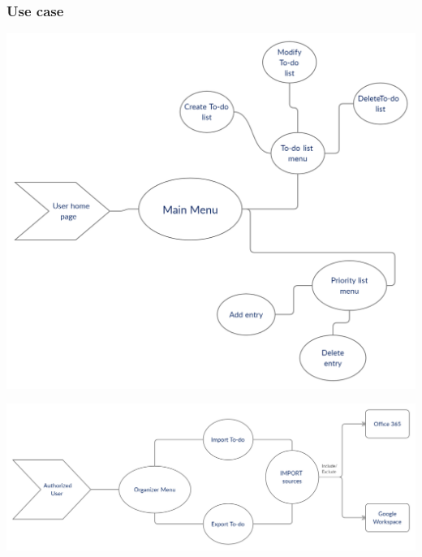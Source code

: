 \subsubsection{Use case}
\par
\includegraphics[width=\textwidth]{diagramusecase1}
\par
\includegraphics[width=\textwidth]{diagramusecase2}
